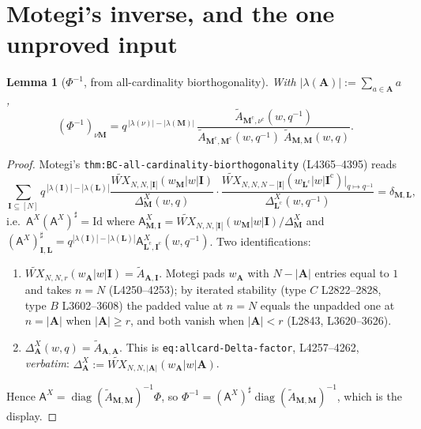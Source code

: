 \documentclass[11pt]{article}
\newtheorem{lem}[thm]{Lemma}
\theoremstyle{definition}
\newcommand{\At}{\widetilde{A}}
\newcommand{\bM}{\mathbf{M}}
\newcommand{\bI}{\mathbf{I}}
\newcommand{\bA}{\mathbf{A}}
\begin{document}
\section{Motegi's inverse, and the one unproved input}
\label{sec:inv}

\begin{lem}[$\Phi^{-1}$, from all-cardinality biorthogonality]\label{lem:inverse}
With $|\lambda(\bA)|:=\sum_{a\in\bA}a$,
\[
  (\Phi^{-1})_{\nu\bM}
  =q^{\,|\lambda(\nu)|-|\lambda(\bM)|}\,
   \frac{\At_{\bM^{\mathrm c},\nu^{\mathrm c}}(w,q^{-1})}
        {\At_{\bM^{\mathrm c},\bM^{\mathrm c}}(w,q^{-1})\;
         \At_{\bM,\bM}(w,q)} .
\]
\end{lem}

\begin{proof}
Motegi's \texttt{thm:BC-all-cardinality-biorthogonality} (L4365--4395) reads
\[
  \sum_{\bI\subseteq[N]}q^{\,|\lambda(\bI)|-|\lambda(\mathbf L)|}
  \frac{\widetilde{WX}_{N,N,|\bI|}(w_{\bM}|w|\bI)}{\Delta^{X}_{\bM}(w,q)}
  \cdot
  \frac{\widetilde{WX}_{N,N,N-|\bI|}
        (w_{\mathbf L^{\mathrm c}}|w|\bI^{\mathrm c})\big|_{q\mapsto q^{-1}}}
       {\Delta^{X}_{\mathbf L^{\mathrm c}}(w,q^{-1})}
  =\delta_{\bM,\mathbf L},
\]
i.e.\ $\mathsf A^{X}(\mathsf A^{X})^{\sharp}=\mathrm{Id}$ where
$\mathsf A^{X}_{\bM,\bI}=\widetilde{WX}_{N,N,|\bI|}(w_\bM|w|\bI)/\Delta^{X}_{\bM}$
and $(\mathsf A^{X})^{\sharp}_{\bI,\mathbf L}
=q^{|\lambda(\bI)|-|\lambda(\mathbf L)|}\mathsf A^{X}_{\mathbf L^{\mathrm c},\bI^{\mathrm c}}(w,q^{-1})$.
Two identifications:
\begin{enumerate}
\item $\widetilde{WX}_{N,N,r}(w_{\bA}|w|\bI)=\At_{\bA,\bI}$.  Motegi pads
  $w_\bA$ with $N-|\bA|$ entries equal to $1$ and takes $n=N$ (L4250--4253); by
  iterated stability (type $C$ L2822--2828, type $B$ L3602--3608) the padded
  value at $n=N$ equals the unpadded one at $n=|\bA|$ when $|\bA|\ge r$, and both
  vanish when $|\bA|<r$ (L2843, L3620--3626).
\item $\Delta^{X}_{\bA}(w,q)=\At_{\bA,\bA}$.  This is
  \texttt{eq:allcard-Delta-factor}, L4257--4262, \emph{verbatim}:
  $\Delta^{X}_{\bA}:=\widetilde{WX}_{N,N,|\bA|}(w_\bA|w|\bA)$.
\end{enumerate}
Hence $\mathsf A^{X}=\operatorname{diag}(\At_{\bM,\bM})^{-1}\Phi$, so
$\Phi^{-1}=(\mathsf A^{X})^{\sharp}\operatorname{diag}(\At_{\bM,\bM})^{-1}$,
which is the display.
\end{proof}
\end{document}
